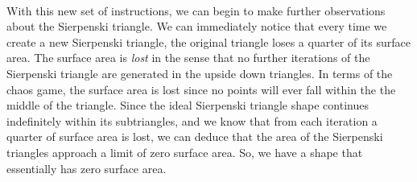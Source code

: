 \documentclass{article}
\begin{document}
\paragraph{}
With this new set of instructions, we can begin to make further observations about the Sierpenski triangle. We can immediately notice that every time we create a new Sierpenski triangle, the original triangle loses a quarter of its surface area. The surface area is \textit{lost} in the sense that no further iterations of the Sierpenski triangle are generated in the upside down triangles. In terms of the chaos game, the surface area is lost since no points will ever fall within the the middle of the triangle. Since the ideal Sierpenski triangle shape continues indefinitely within its subtriangles, and we know that from each iteration a quarter of surface area is lost, we can deduce that the area of the Sierpenski triangles approach a limit of zero surface area. So, we have a shape that essentially has zero surface area.
\end{document}
